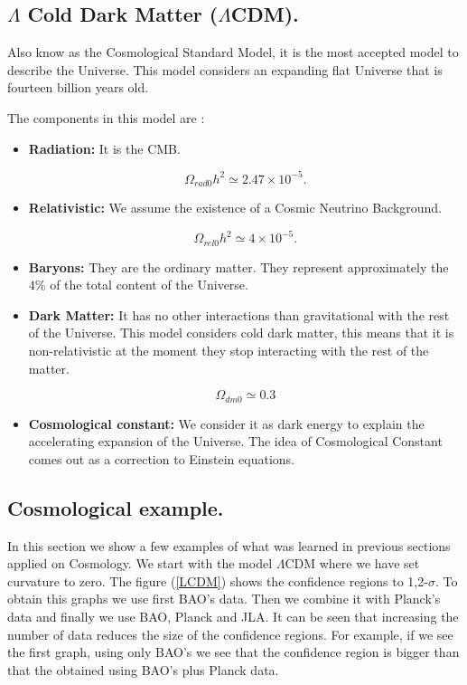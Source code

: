 \documentclass[onecolumn,           %
               showpacs,            %
               preprintnumbers,     %
               aps,                 %
               prl,          	    %
               letterpaper,             %
               superscriptaddress,      %
               nofootinbib,         %
               tightenlines,        %
               floats,floatfix      %
               ,usenatbib,
               ]{revtex4-1}
\begin{document}
\subsection{$\Lambda$ Cold Dark Matter ($\Lambda$CDM).}
Also know as the Cosmological Standard Model, it is the most accepted model to describe the Universe. This model considers an expanding flat Universe that is fourteen billion years old. 

The components in this model are \cite{liddle}:

\begin{itemize}
	\item \textbf{Radiation:} It is the CMB.
	
	\begin{equation}
	\Omega_{rad 0}h^2 \simeq 2.47 \times 10^{-5} .
	\end{equation}
	
	\item \textbf{Relativistic:} We assume the existence of a Cosmic Neutrino Background.
	
	\begin{equation}
	\Omega_{rel 0}h^2 \simeq 4 \times 10^{-5} .
	\end{equation}
	
	\item \textbf{Baryons:} They are the ordinary matter. They represent approximately the $4 \%$ of the total content of the Universe.
	
	\item \textbf{Dark Matter:} It has no other interactions than gravitational with the rest of the Universe. This model considers cold dark matter, this means that it is non-relativistic at the moment they stop interacting with the rest of the matter.
	
	\begin{equation}
	\Omega_{dm 0} \simeq 0.3
	\end{equation}
	
	\item \textbf{Cosmological constant:} We consider it as dark energy to explain the accelerating expansion of the Universe. The idea of Cosmological Constant comes out as a correction to Einstein equations.
\end{itemize}

\subsection{Cosmological example.}
In this section we show a few examples of what was learned in previous sections applied on Cosmology. We start with the model $\Lambda$CDM where we have set curvature to zero. The figure (\ref{LCDM}) shows the confidence regions to 1,2-$\sigma$. To obtain this graphs we use first BAO's data. Then we combine it with Planck's data and finally we use BAO, Planck and JLA. It can be seen that increasing the number of data reduces the size of the confidence regions. For example, if we see the first graph, using only BAO's we see that the confidence region is bigger than that the obtained using BAO's plus Planck data. 
\end{document}
